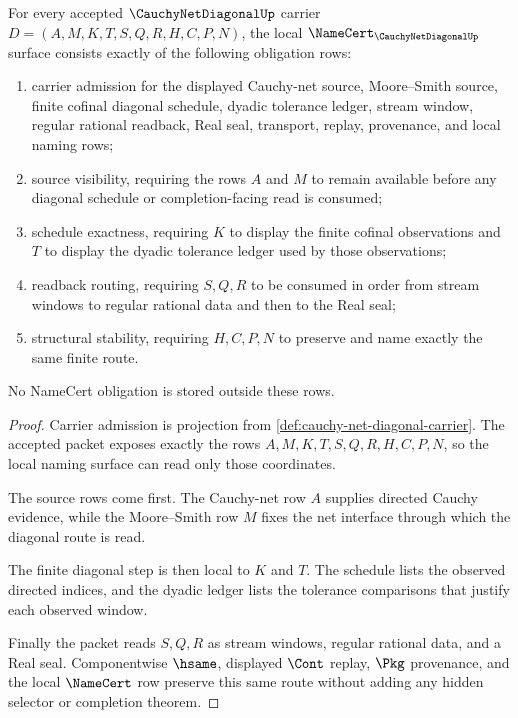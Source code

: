 \begin{theorem}
\label{thm:cauchy-net-diagonal-namecert-obligations}
For every accepted $\CauchyNetDiagonalUp$ carrier $D=(A,M,K,T,S,Q,R,H,C,P,N)$, the local $\NameCert_{\CauchyNetDiagonalUp}$ surface consists exactly of the following obligation rows:
\begin{enumerate}
\item carrier admission for the displayed Cauchy-net source, Moore--Smith source, finite cofinal diagonal schedule, dyadic tolerance ledger, stream window, regular rational readback, Real seal, transport, replay, provenance, and local naming rows;
\item source visibility, requiring the rows $A$ and $M$ to remain available before any diagonal schedule or completion-facing read is consumed;
\item schedule exactness, requiring $K$ to display the finite cofinal observations and $T$ to display the dyadic tolerance ledger used by those observations;
\item readback routing, requiring $S,Q,R$ to be consumed in order from stream windows to regular rational data and then to the Real seal;
\item structural stability, requiring $H,C,P,N$ to preserve and name exactly the same finite route.
\end{enumerate}
No NameCert obligation is stored outside these rows.
\end{theorem}
\begin{proof}
Carrier admission is projection from \autoref{def:cauchy-net-diagonal-carrier}. The accepted packet exposes exactly the rows $A,M,K,T,S,Q,R,H,C,P,N$, so the local naming surface can read only those coordinates.

The source rows come first. The Cauchy-net row $A$ supplies directed Cauchy evidence, while the Moore--Smith row $M$ fixes the net interface through which the diagonal route is read.

The finite diagonal step is then local to $K$ and $T$. The schedule lists the observed directed indices, and the dyadic ledger lists the tolerance comparisons that justify each observed window.

Finally the packet reads $S,Q,R$ as stream windows, regular rational data, and a Real seal. Componentwise $\hsame$, displayed $\Cont$ replay, $\Pkg$ provenance, and the local $\NameCert$ row preserve this same route without adding any hidden selector or completion theorem.
\end{proof}


